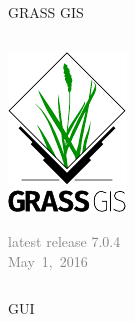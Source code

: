 \documentclass[xcolor={dvipsnames,usenames},beamer,aspectratio=169]{beamer}
\begin{document}
\begin{frame}{GRASS GIS}
\begin{columns}
\begin{column}{0.3\textwidth}
\begin{center}
  \includegraphics[width=\textwidth]{logos/grass_gis}
\end{center}

\textcolor{gray}{
\footnotesize
latest release 7.0.4 \\May~1,~2016
}

\end{column}
\end{columns}

\end{frame}


\begin{frame}{GUI}

\begin{center}
\end{center}

\end{frame}
\end{document}
